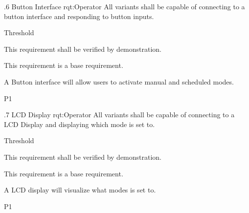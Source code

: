 \ONERQMTVKPP
{\RqtNumberBase.6}
{Button Interface}
{rqt:Operator}
{All \ThisSys variants shall be capable of connecting to a button interface and responding to button inputs.}
{
	\item [All Phases] Threshold
}
{This requirement shall be verified by demonstration.}
{
	\item [N/A] This requirement is a base requirement.
}
{
  \item A Button interface will allow \ThisSystem users to activate manual and scheduled modes. 
}
{P1}

\ONERQMTVKPP
{\RqtNumberBase.7}
{LCD Display}
{rqt:Operator}
{All \ThisSys variants shall be capable of connecting to a LCD Display and displaying which mode \ThisSys is set to.}
{
	\item [All Phases] Threshold
}
{This requirement shall be verified by demonstration.}
{
	\item [N/A] This requirement is a base requirement.
}
{
  \item A LCD display will visualize what modes \ThisSys is set to. 
}
{P1}


